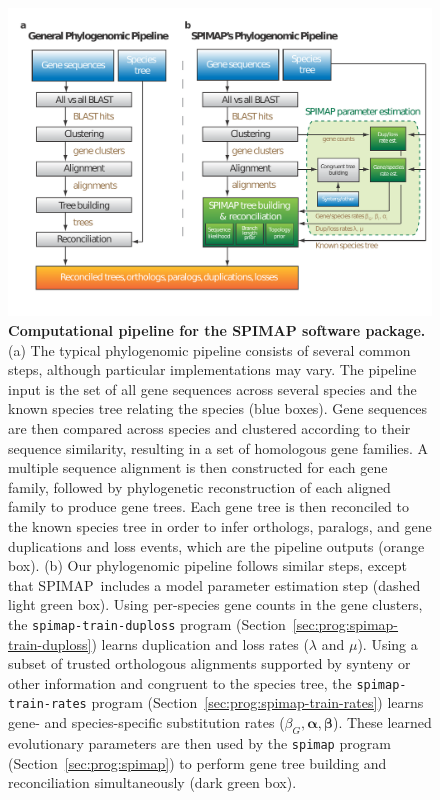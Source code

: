 \documentclass[11pt]{article}
\newcommand{\secref}[1]{Section~\ref{#1}}
\newcommand{\spimap}{{\sf\scshape SPIMAP}}
\newcommand{\V}[1]{{\bm #1}}
\begin{document}
\begin{figure}
\begin{center}
\includegraphics[width=5.5in]{figures/pipeline.pdf}
\vspace{-.4in}
\end{center}

\caption{{\bf Computational pipeline for the SPIMAP software package.}
 (a) The typical phylogenomic pipeline consists of several common
 steps, although particular implementations may vary.  The pipeline
 input is the set of all gene sequences across several species and the
 known species tree relating the species (blue boxes).  Gene sequences
 are then compared across species and clustered according to their
 sequence similarity, resulting in a set of homologous gene families.
 A multiple sequence alignment is then constructed for each gene
 family, followed by phylogenetic reconstruction of each aligned
 family to produce gene trees.  Each gene tree is then reconciled to
 the known species tree in order to infer orthologs, paralogs, and
 gene duplications and loss events, which are the pipeline outputs
 (orange box).  \newline (b) Our phylogenomic pipeline follows similar
 steps, except that \spimap\ includes a model parameter estimation
 step (dashed light green box).  Using per-species gene counts in the
 gene clusters, the {\tt spimap-train-duploss} program
 (\secref{sec:prog:spimap-train-duploss}) learns duplication and loss
 rates ($\lambda$ and $\mu$).  Using a subset of trusted orthologous
 alignments supported by synteny or other information and congruent to
 the species tree, the {\tt spimap-train-rates} program
 (\secref{sec:prog:spimap-train-rates}) learns gene- and
 species-specific substitution rates ($\beta_G, \V{\alpha},
 \V{\beta}$). These learned evolutionary parameters are then
used by the {\tt spimap} program (\secref{sec:prog:spimap}) to perform
 gene tree building and reconciliation simultaneously (dark
 green box). }
\label{fig:pipeline}
\end{figure}
\end{document}
